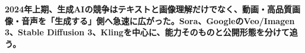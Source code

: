 \noindent\textbf{2024年上期、生成AIの競争はテキストと画像理解だけでなく、動画・高品質画像・音声を「生成する」側へ急速に広がった。Sora、GoogleのVeo/Imagen 3、Stable Diffusion 3、Klingを中心に、能力そのものと公開形態を分けて追う。}\autocite{src-0f33134a9129,src-0fe343211040,src-7b3484ead314,src-9c32b95d27a7}
